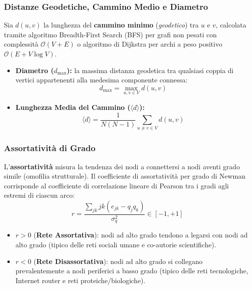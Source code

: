 \subsubsection{Distanze Geodetiche, Cammino Medio e Diametro}
Sia $d(u, v)$ la lunghezza del \textbf{cammino minimo} (\textit{geodetico}) tra $u$ e $v$, calcolata tramite algoritmo Breadth-First Search (BFS) per grafi non pesati con complessità $\mathcal{O}(V + E)$ o algoritmo di Dijkstra per archi a peso positivo $\mathcal{O}(E + V \log V)$.
\begin{itemize}
    \item \textbf{Diametro ($d_{\max}$):} la massima distanza geodetica tra qualsiasi coppia di vertici appartenenti alla medesima componente connessa:
    \begin{equation}
        d_{\max} = \max_{u, v \in V} d(u, v)
    \end{equation}
    \item \textbf{Lunghezza Media del Cammino ($\langle d \rangle$):}
    \begin{equation}
        \langle d \rangle = \frac{1}{N(N-1)} \sum_{u \ne v \in V} d(u, v)
    \end{equation}
\end{itemize}

\subsubsection{Assortatività di Grado}
L'\textbf{assortatività} misura la tendenza dei nodi a connettersi a nodi aventi grado simile (omofilia strutturale). Il coefficiente di assortatività per grado di Newman \cite{newman2003} corrisponde al coefficiente di correlazione lineare di Pearson tra i gradi agli estremi di ciascun arco:
\begin{equation}
    r = \frac{\sum_{jk} jk (e_{jk} - q_j q_k)}{\sigma_q^2} \in [-1, +1]
\end{equation}
\begin{itemize}
    \item $r > 0$ (\textbf{Rete Assortativa}): nodi ad alto grado tendono a legarsi con nodi ad alto grado (tipico delle reti sociali umane e co-autorie scientifiche).
    \item $r < 0$ (\textbf{Rete Disassortativa}): nodi ad alto grado si collegano prevalentemente a nodi periferici a basso grado (tipico delle reti tecnologiche, Internet router e reti proteiche/biologiche).
\end{itemize}

